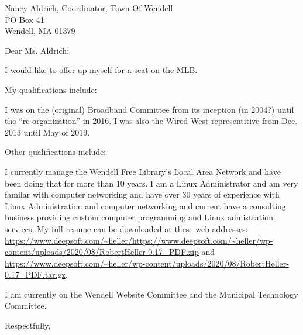 \documentclass[12pt,twoside]{letter}
\begin{document}
\begin{letter}{Nancy Aldrich, Coordinator, Town Of Wendell\\PO Box 41\\ Wendell, MA 01379}
\opening{Dear Ms. Aldrich:}

I would like to offer up myself for a seat on the MLB.

My qualifications include:

I was on the (original) Broadband Committee from its inception (in 2004?)
until the ``re-organization'' in 2016. I was also the Wired West representitive
from Dec. 2013 until May of 2019.

Other qualifications include:

I currently manage the Wendell Free Library's Local Area Network and have been
doing that for more than 10 years. I am a Linux Administrator and am very
familar with computer networking and have over 30 years of experience with
Linux Administration and computer networking and current have a consulting
business providing custom computer programming and Linux admistration
services. My full resume can be downloaded at these web addresses:
\url{https://www.deepsoft.com/~heller/https://www.deepsoft.com/~heller/wp-content/uploads/2020/08/RobertHeller-0.17_PDF.zip}
and
\url{https://www.deepsoft.com/~heller/wp-content/uploads/2020/08/RobertHeller-0.17_PDF.tar.gz}.

I am currently on the Wendell Website Committee and the Municipal Technology
Committee.


\closing{Respectfully,}
\end{letter}
\end{document}
